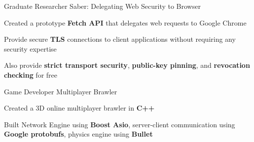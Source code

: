 


\begin{cventries}


\cventry
{Graduate Researcher} %
{Saber: Delegating Web Security to Browser} %
{} %
{} %
{ %
\begin{cvitems}
\item{Created a prototype \textbf{Fetch API} that delegates web requests to Google Chrome}
\item{Provide secure \textbf{TLS} connections to client applications without requiring any security expertise}
\item{Also provide \textbf{strict transport security}, \textbf{public-key pinning}, and \textbf{revocation checking} for free}
\end{cvitems}
}


\cventry
{Game Developer} %
{Multiplayer Brawler} %
{} %
{} %
{ %
\begin{cvitems}
\item{Created a 3D online multiplayer brawler in \textbf{C++}}
\item{Built Network Engine using \textbf{Boost Asio}, server-client communication using \textbf{Google protobufs}, physics engine using \textbf{Bullet}}
\end{cvitems}
}


\end{cventries}
